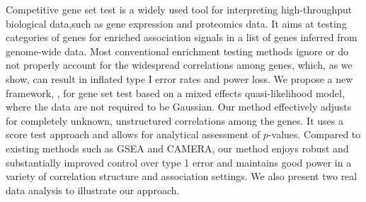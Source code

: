 Competitive gene set test is a widely used tool for interpreting high-throughput biological 
data,such as gene expression and proteomics data. It aims at testing categories of genes for 
enriched association signals in a list of genes inferred from genome-wide data. Most 
conventional enrichment testing methods ignore or do not properly account for the widespread 
correlations among genes, which, as we show, can result in inflated type I error rates and 
power loss. We propose a new framework, \OurMethod, for gene set test based on a mixed effects 
quasi-likelihood model, where the data are not required to be Gaussian. Our method effectively 
adjusts for completely unknown,	unstructured correlations among the genes. It uses a score test 
approach and allows for analytical assessment of $p$-values. Compared to existing methods such 
as GSEA and CAMERA, our method enjoys robust and substantially improved control over type 1 
error and maintains good power in a variety of correlation structure and association settings. 
We also present two real data analysis to illustrate our approach.